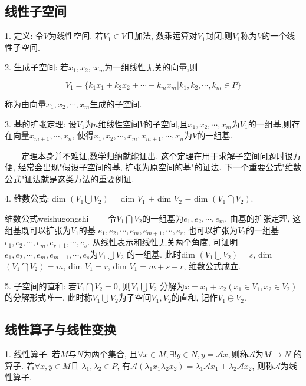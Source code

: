 \subsection{线性子空间}

1. 定义: 令$V$为线性空间. 若$V_1 \in V$且加法, 数乘运算对$V_1$封闭,则$V_1$称为$V$的一个线性子空间.

2. 生成子空间: 若$x_1,x_2,\cdot x_m$为一组线性无关的向量,则

$$V_1=\{k_1x_1+k_2x_2+\cdots+k_mx_m|k_1,k_2,\cdots,k_m \in P\}$$

称为由向量$x_1,x_2,\cdots,x_m$生成的子空间.

3. 基的扩张定理: 设$V_1$为$n$维线性空间$V$的子空间,且$x_1,x_2,\cdots,x_m$为$V_1$的一组基,则存在向量$x_{m+1},\cdots,x_n$, 
使得$x_1,x_2,\cdots,x_m,x_{m+1},\cdots,x_n$为$V$的一组基.

\begin{tcolorbox}[colback=gray!5,colframe=orange!75!black,title=注意事项]
    ~~~~定理本身并不难证,数学归纳就能证出. 这个定理在用于求解子空间问题时很方便, 经常会出现"假设子空间的基, 扩张为原空间的基"的证法. 
    下一个重要公式"维数公式"证法就是这类方法的重要例证.
  \end{tcolorbox}

  4. 维数公式: dim $(V_1 \bigcup V_2)$ = dim $V_1$ $+$ dim $V_2$ $-$ dim $(V_1 \bigcap V_2)$.

  \begin{coro}{维数公式}{weishugongshi}
    ~~~~令$V_1 \bigcap V_2$的一组基为$e_1,e_2,\cdots,e_m$. 由基的扩张定理, 这组基既可以扩张为$V_1$的基
    $e_1,e_2,\cdots,e_m,e_{m+1},\cdots,e_r$, 也可以扩张为$V_2$的一组基$e_1,e_2,\cdots,e_m,e_{r+1},\cdots,e_s$. 
    从线性表示和线性无关两个角度, 可证明$e_1,e_2,\cdots,e_m,e_{m+1},\cdots,e_s$为$V_1 \bigcup V_2$ 的一组基. 
    此时dim $(V_1 \bigcup V_2) = s$, dim $(V_1 \bigcap V_2) = m$, dim $V_1 = r$, dim $V_1 = m+s-r$, 维数公式成立. 
  \end{coro}

  5. 子空间的直和: 若$V_1 \bigcap V_2 = 0$, 则$V_1 \bigcup V_2$ 分解为$x=x_1+x_2 (x_1 \in V_1, x_2 \in V_2)$的分解形式唯一. 
  此时称$V_1 \bigcup V_2$为子空间$V_1,V_2$的直和, 记作$V_1 \oplus V_2$.
  
  \subsection{线性算子与线性变换}

  1. 线性算子: 若$M$与$N$为两个集合, 且$\forall x \in M, \exists ! y \in N, y=\mathscr{A}x, $则称$\mathscr{A}$为$M\rightarrow N$ 的算子. 
  若$\forall x,y \in M$且 $\lambda_1,\lambda_2 \in P$, 有$\mathscr{A}(\lambda_1 x_1 \lambda_2 x_2)=\lambda_1 \mathscr{A}x_1+\lambda_2 \mathscr{A} x_2$, 则称$\mathscr{A}$为线性算子.


